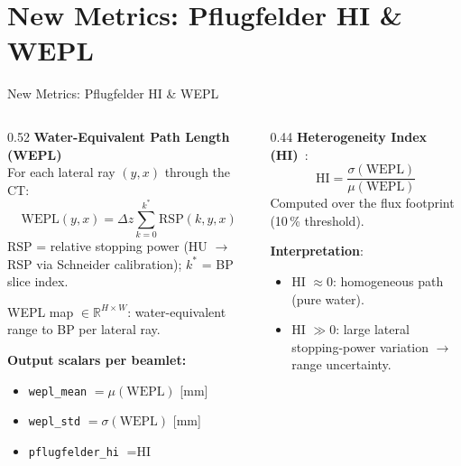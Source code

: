 \documentclass[aspectratio=169, 10pt]{beamer}
\begin{document}
\section{New Metrics: Pflugfelder HI \& WEPL}

\begin{frame}{New Metrics: Pflugfelder HI \& WEPL}
  \begin{columns}[T]
    \begin{column}{0.52\textwidth}
      \textbf{Water-Equivalent Path Length (WEPL)}\\
      For each lateral ray $(y, x)$ through the CT:
      \begin{equation*}
        \text{WEPL}(y,x)
        = \Delta z \sum_{k=0}^{k^*}
          \text{RSP}(k, y, x)
      \end{equation*}
      $\text{RSP}$ = relative stopping power (HU $\to$ RSP
      via Schneider calibration);
      $k^*$ = BP slice index.

      \vspace{2pt}
      WEPL map $\in \mathbb{R}^{H \times W}$: water-equivalent
      range to BP per lateral ray.

      \vspace{4pt}
      \textbf{Output scalars per beamlet:}
      \begin{itemize}\setlength{\itemsep}{0pt}
        \item \texttt{wepl\_mean} $= \mu(\text{WEPL})$ [mm]
        \item \texttt{wepl\_std} $= \sigma(\text{WEPL})$ [mm]
        \item \texttt{pflugfelder\_hi} $= \text{HI}$
      \end{itemize}
    \end{column}
    \begin{column}{0.44\textwidth}
      \textbf{Heterogeneity Index (HI)}~\cite{pflugfelder2007}:
      \begin{equation*}
        \text{HI} = \frac{\sigma(\text{WEPL})}{\mu(\text{WEPL})}
      \end{equation*}
      Computed over the flux footprint (10\,\% threshold).

      \vspace{4pt}
      \textbf{Interpretation}:
      \begin{itemize}\setlength{\itemsep}{1pt}
        \item HI $\approx 0$: homogeneous path (pure water).
        \item HI $\gg 0$: large lateral stopping-power
              variation $\to$ range uncertainty.
      \end{itemize}


\end{column}
\end{columns}
\end{frame}
\end{document}
